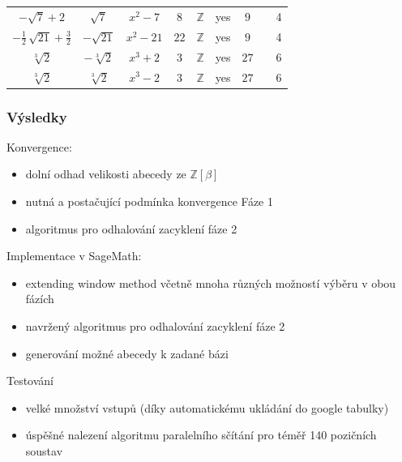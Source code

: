 \documentclass[11pt]{beamer}
\newcommand{\Zbeta}{\mathbb{Z}[\beta]}
\newcommand{\ZZ}{\mathbb{Z}}
\renewcommand\checkmark{\ding{51}}
\begin{document}
\begin{frame}
\begin{tabular}{c|cc| cc c| c| c c }
$ -\sqrt{7} + 2 $ & $ \sqrt{7} $ & $ x^{2} - 7 $  & $ 8 $ & $\ZZ$ & yes & $ 9 $ & \checkmark & 4 \\
$ -\frac{1}{2} \, \sqrt{21} + \frac{3}{2} $ & $ -\sqrt{21} $ & $ x^{2} - 21 $  & $ 22 $ & $\ZZ$ & yes & $ 9 $ & \checkmark & 4 \\
$ \sqrt[3]{2} $ & $ -\sqrt[3]{2} $ & $ x^{3} + 2 $ & $ 3 $& $\ZZ$  & yes & $ 27 $ &  \checkmark & 6 \\
$ \sqrt[3]{2} $ & $ \sqrt[3]{2} $ & $ x^{3} - 2 $ & $ 3 $ & $\ZZ$ & yes & $ 27 $ &  \checkmark & 6 \\
\end{tabular}

\end{frame}

\begin{frame}
    \frametitle{Výsledky}    
	Konvergence:
    \begin{itemize}
        \item dolní odhad velikosti abecedy ze $\Zbeta$
        \item nutná a postačující podmínka konvergence Fáze 1
        \item algoritmus pro odhalování zacyklení fáze 2
    \end{itemize}
    \pause
    Implementace v SageMath:
    \begin{itemize}
        \item extending window method včetně mnoha různých možností výběru v obou fázích
        \item navržený algoritmus pro odhalování zacyklení fáze 2
        \item generování možné abecedy k zadané bázi
    \end{itemize}    
    \pause
    Testování
    \begin{itemize}
	    \item velké množství vstupů (díky automatickému ukládání do google tabulky)
	    \item úspěšné nalezení algoritmu paralelního sčítání pro téměř 140 pozičních soustav
    \end{itemize}
\end{frame}
\end{document}
